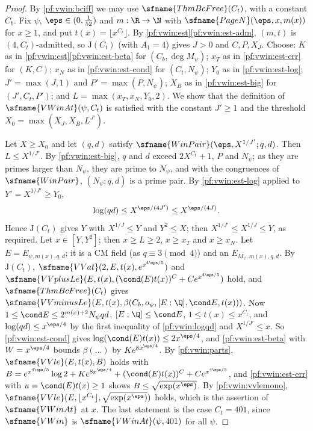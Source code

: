 \begin{proof}
By \cref{pf:vwin:bciff} we may use $\sfname{ThmBcFree}(C_t)$, with a constant $C_b$. Fix $\psi$, $\eps\in(0,\frac1{52})$ and
$m:\R\to\N$ with $\sfname{PageN}(\eps,x,m(x))$ for $x\ge1$, and put $t(x)=\lfloor x^{C_t}\rfloor$. By
\cref{pf:vwin:est}\ref{pf:vwin:est-adm}, $(m,t)$ is $(4,C_t)$-admitted, so $\mathrm{J}(C_t)$ (with $A_1=4$) gives $J>0$ and
$C,P,X_J$. Choose: $K$ as in \cref{pf:vwin:est}\ref{pf:vwin:est-beta} for $(C_b,\deg M_\psi)$; $x_T$ as in
\ref{pf:vwin:est-err} for $(K,C)$; $x_N$ as in \ref{pf:vwin:est-cond} for $(C_t,N_\psi)$; $Y_0$ as in \ref{pf:vwin:est-log};
$J'=\max(J,1)$ and $P'=\max(P,N_\psi)$; $X_B$ as in \ref{pf:vwin:est-big} for $(J',C_t,P')$; and $L=\max(x_T,x_N,Y_0,2)$.
We show that the definition of $\sfname{VWinAt}(\psi,C_t)$ is satisfied with the constant $J'\ge1$ and the threshold
$X_0=\max(X_J,X_B,L^{J'})$.

Let $X\ge X_0$ and let $(q,d)$ satisfy $\sfname{WinPair}(\eps,X^{1/J'};q,d)$. Then $L\le X^{1/J'}$. By
\ref{pf:vwin:est-big}, $q$ and $d$ exceed $2X^{C_t}+1$, $P$ and $N_\psi$; as they are primes larger than $N_\psi$, they are
prime to $N_\psi$, and with the congruences of $\sfname{WinPair}$, $(N_\psi;q,d)$ is a prime pair. By \ref{pf:vwin:est-log}
applied to $Y'=X^{1/J'}\ge Y_0$,
\begin{equation}\label{pf:vwin:logqd}
 \log(qd)\le X^{\eps/(4J')}\le X^{\eps/(4J)} .
\end{equation}
Hence $\mathrm{J}(C_t)$ gives $Y$ with $X^{1/J}\le Y$ and $Y^2\le X$; then $X^{1/J'}\le X^{1/J}\le Y$, as required. Let
$x\in[Y,Y^2]$; then $x\ge L\ge2$, $x\ge x_T$ and $x\ge x_N$. Let $E=E_{\psi,m(x),q,d}$; it is a CM field (as $q\equiv3\pmod4$) and an
$E_{M_\psi,m(x),q,d}$. By $\mathrm{J}(C_t)$, $\sfname{VVat}(2,E,t(x),e^{x^{4\eps/5}})$ and
$\sfname{VVplusLe}(E,t(x),(\cond(E)t(x))^C+Ce^{x^{4\eps/5}})$ hold, and $\sfname{ThmBcFree}(C_t)$ gives
$\sfname{VVminusLe}(E,t(x),\beta(C_b,o_\psi,[E:\Q],\cond E,t(x)))$. Now $1\le\cond E\le2^{m(x)+2}N_\psi qd$,
$[E:\Q]\le\cond E$, $1\le t(x)\le x^{C_t}$, and $\log(qd)\le x^{\eps/4}$ by the first inequality of \eqref{pf:vwin:logqd} and
$X^{1/J'}\le x$. So \ref{pf:vwin:est-cond} gives $\log(\cond(E)t(x))\le2x^{\eps/4}$, and \ref{pf:vwin:est-beta} with
$W=x^{\eps/4}$ bounds $\beta(\dots)$ by $Ke^{8x^{\eps/4}}$. By \cref{pf:vwin:parts}, $\sfname{VVle}(E,t(x),B)$ holds with
$B=e^{x^{4\eps/5}}\log2+Ke^{8x^{\eps/4}}+(\cond(E)t(x))^C+Ce^{x^{4\eps/5}}$, and \ref{pf:vwin:est-err} with $u=\cond(E)t(x)\ge1$
shows $B\le\sqrt{\exp(x^\eps)}$. By \cref{pf:vwin:vvlemono}, $\sfname{VVle}(E,\lfloor x^{C_t}\rfloor,
\sqrt{\exp(x^\eps)})$ holds, which is the assertion of $\sfname{VWinAt}$ at $x$. The last statement is the case
$C_t=401$, since $\sfname{VWin}$ is $\sfname{VWinAt}(\psi,401)$ for all $\psi$.
\end{proof}


